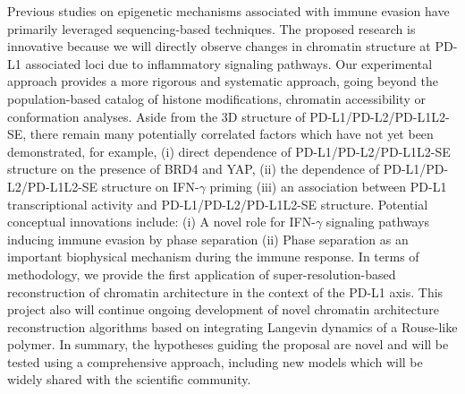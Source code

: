 Previous studies on epigenetic mechanisms associated with immune evasion have primarily leveraged sequencing-based techniques. The proposed research is innovative because we will directly observe changes in chromatin structure at PD-L1 associated loci due to inflammatory signaling pathways. Our experimental approach provides a more rigorous and systematic approach, going beyond the population-based catalog of histone modifications, chromatin accessibility or conformation analyses. Aside from the 3D structure of PD-L1/PD-L2/PD-L1L2-SE, there remain many potentially correlated factors which have not yet been demonstrated, for example, (i) direct dependence of PD-L1/PD-L2/PD-L1L2-SE structure on the presence of BRD4 and YAP, (ii) the dependence of PD-L1/PD-L2/PD-L1L2-SE structure on IFN-$\gamma$ priming (iii) an association between PD-L1 transcriptional activity and PD-L1/PD-L2/PD-L1L2-SE structure. Potential conceptual innovations include: (i) A novel role for IFN-$\gamma$ signaling pathways inducing immune evasion by phase separation (ii) Phase separation as an important biophysical mechanism during the immune response. In terms of methodology, we provide the first application of super-resolution-based reconstruction of chromatin architecture in the context of the PD-L1 axis. This project also will continue ongoing development of novel chromatin architecture reconstruction algorithms based on integrating Langevin dynamics of a Rouse-like polymer. In summary, the hypotheses guiding the proposal are novel and will be tested using a comprehensive approach, including new models which will be widely shared with the scientific community.
